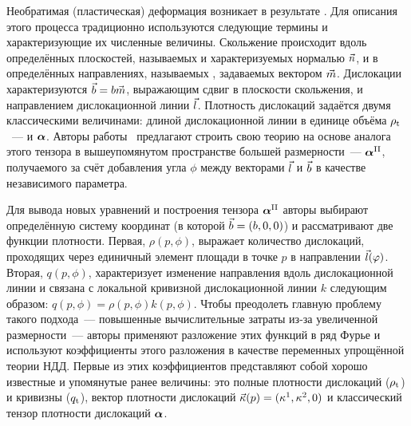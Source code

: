 \documentclass[a4paper, 14pt, titlepage]{extarticle}
\newcommand{\tot}{\textup{t}}    %
\newcommand{\plast}{\textup{pl}} %
\newcommand{\II}{\textup{II}}    %
\begin{document}
  Необратимая (пластическая) деформация возникает в результате . Для описания
  этого процесса традиционно используются следующие термины и характеризующие их численные величины. Скольжение
  происходит вдоль определённых плоскостей, называемых  и
  характеризуемых нормалью $\vec{n}$, и в определённых направлениях, называемых , задаваемых вектором $\vec{m}$. Дислокации характеризуются 
  $\vec{b} = b \vec{m}$, выражающим сдвиг в плоскости скольжения, и направлением дислокационной
  линии $\vec{l}$.  Плотность дислокаций задаётся двумя классическими величинами: длиной
  дислокационной линии в единице объёма $\rho_\tot$~---  и
   $\bm{\alpha}$. %
  Авторы работы~\cite{hochrainer-cdd} предлагают строить свою теорию на основе аналога этого тензора
  в вышеупомянутом пространстве большей размерности~---  $\matx{\alpha}^\II$, получаемого за счёт добавления угла $\phi$ между векторами $\vec{l}$ и
  $\vec{b}$ в качестве независимого параметра.

  Для вывода новых уравнений и построения тензора $\matx{\alpha}^\II$ авторы выбирают определённую
  систему координат (в которой $\vec{b} = (b,0,0)$) и рассматривают две функции плотности.
  Первая, $\rho(p,\phi)$, выражает количество дислокаций, проходящих через единичный элемент площади в
  точке $p$ в направлении $\vec{l}(\varphi)$. Вторая,  $q(p,\phi)$,
  характеризует изменение направления вдоль дислокационной линии и связана с локальной кривизной
  дислокационной линии $k$ следующим образом: $q(p,\phi) = \rho(p, \phi) k(p, \phi)$.
  Чтобы преодолеть главную проблему такого подхода~--- повышенные вычислительные затраты из-за
  увеличенной размерности~--- авторы применяют разложение этих функций в ряд Фурье и используют
  коэффициенты этого разложения в качестве переменных упрощённой теории НДД.
  Первые из этих коэффициентов представляют собой хорошо известные и упомянутые ранее величины: это
  полные плотности дислокаций ($\rho_\tot$) и кривизны ($q_\tot$), вектор плотности дислокаций
  $\vec{\kappa}(p) = (\kappa^1,\kappa^2,0)$ и классический тензор плотности дислокаций $\bm{\alpha}$.
\end{document}

